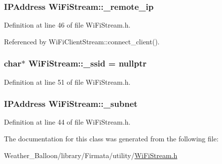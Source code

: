 \subsubsection[{\texorpdfstring{\+\_\+remote\+\_\+ip}{\_remote\_ip}}]{\setlength{\rightskip}{0pt plus 5cm}I\+P\+Address Wi\+Fi\+Stream\+::\+\_\+remote\+\_\+ip\hspace{0.3cm}{\ttfamily [protected]}}\hypertarget{class_wi_fi_stream_af81541aec7d6be3be1466caf8bc68820}{}\label{class_wi_fi_stream_af81541aec7d6be3be1466caf8bc68820}


Definition at line 46 of file Wi\+Fi\+Stream.\+h.



Referenced by Wi\+Fi\+Client\+Stream\+::connect\+\_\+client().

\subsubsection[{\texorpdfstring{\+\_\+ssid}{\_ssid}}]{\setlength{\rightskip}{0pt plus 5cm}char$\ast$ Wi\+Fi\+Stream\+::\+\_\+ssid = nullptr\hspace{0.3cm}{\ttfamily [protected]}}\hypertarget{class_wi_fi_stream_a428e3d50bc45a3f2de02d7edc7d9509d}{}\label{class_wi_fi_stream_a428e3d50bc45a3f2de02d7edc7d9509d}


Definition at line 51 of file Wi\+Fi\+Stream.\+h.

\subsubsection[{\texorpdfstring{\+\_\+subnet}{\_subnet}}]{\setlength{\rightskip}{0pt plus 5cm}I\+P\+Address Wi\+Fi\+Stream\+::\+\_\+subnet\hspace{0.3cm}{\ttfamily [protected]}}\hypertarget{class_wi_fi_stream_aa37dbf267daa7afa939183cd77bb5ee7}{}\label{class_wi_fi_stream_aa37dbf267daa7afa939183cd77bb5ee7}


Definition at line 44 of file Wi\+Fi\+Stream.\+h.



The documentation for this class was generated from the following file\+:\begin{DoxyCompactItemize}
\item 
Weather\+\_\+\+Balloon/library/\+Firmata/utility/\hyperlink{_wi_fi_stream_8h}{Wi\+Fi\+Stream.\+h}\end{DoxyCompactItemize}

